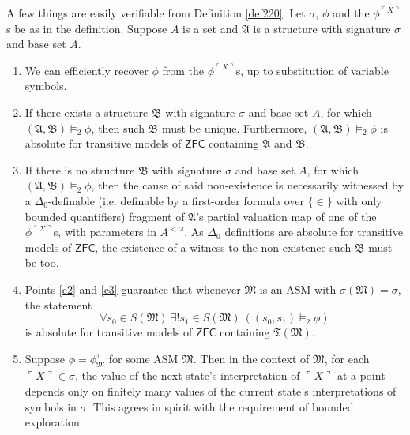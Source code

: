 \documentclass[12pt]{article}
\numberwithin{equation}{section}
\begin{document}
A few things are easily verifiable from Definition \ref{def220}. Let $\sigma$, $\phi$ and the $\phi^{\ulcorner X \urcorner}$s be as in the definition. Suppose $A$ is a set and $\mathfrak{A}$ is a structure with signature $\sigma$ and base set $A$.
\begin{enumerate}[label=(C\arabic*)]
    \item We can efficiently recover $\phi$ from the $\phi^{\ulcorner X \urcorner}$s, up to substitution of variable symbols.
    \item\label{c2} If there exists a structure $\mathfrak{B}$ with signature $\sigma$ and base set $A$, for which $(\mathfrak{A}, \mathfrak{B}) \models_2 \phi$, then such $\mathfrak{B}$ must be unique. Furthermore, $(\mathfrak{A}, \mathfrak{B}) \models_2 \phi$ is absolute for transitive models of $\mathsf{ZFC}$ containing $\mathfrak{A}$ and $\mathfrak{B}$.
    \item\label{c3} If there is no structure $\mathfrak{B}$ with signature $\sigma$ and base set $A$, for which $(\mathfrak{A}, \mathfrak{B}) \models_2 \phi$, then the cause of said non-existence is necessarily witnessed by a $\Delta_0$-definable (i.e. definable by a first-order formula over $\{\in\}$ with only bounded quantifiers) fragment of $\mathfrak{A}$'s partial valuation map of one of the $\phi^{\ulcorner X \urcorner}$s, with parameters in $A^{< \omega}$. As $\Delta_0$ definitions are absolute for transitive models of $\mathsf{ZFC}$, the existence of a witness to the non-existence such $\mathfrak{B}$ must be too.
    \item\label{c4} Points \ref{c2} and \ref{c3} guarantee that whenever $\mathfrak{M}$ is an ASM with $\sigma(\mathfrak{M}) = \sigma$, the statement
    \begin{equation*}
        \forall s_0 \in S(\mathfrak{M}) \ \exists ! s_1 \in S(\mathfrak{M}) \ ((s_0, s_1) \models_2 \phi)
    \end{equation*}
    is absolute for transitive models of $\mathsf{ZFC}$ containing $\mathfrak{T}(\mathfrak{M})$.
    \item Suppose $\phi = \phi^{\tau}_{\mathfrak{M}}$ for some ASM $\mathfrak{M}$. Then in the context of $\mathfrak{M}$, for each $\ulcorner X \urcorner \in \sigma$, the value of the next state's interpretation of $\ulcorner X \urcorner$ at a point depends only on finitely many values of the current state's interpretations of symbols in $\sigma$. This agrees in spirit with the requirement of bounded exploration.
\end{enumerate}
\end{document}
